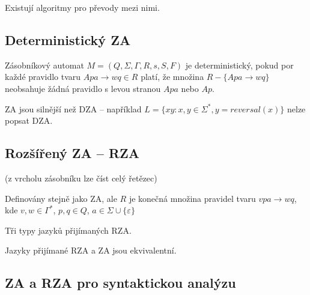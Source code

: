 \documentclass[a4wide]{report}
\begin{document}
Existují algoritmy pro převody mezi nimi.

\subsection{Deterministický ZA}

Zásobníkový automat $M = (Q, \Sigma, \Gamma, R, s, S, F)$ je deterministický, pokud por každé pravidlo tvaru $Apa \to wq \in R$ platí, že množina $R - \{ Apa \to wq \}$ neobsahuje žádná pravidlo s levou stranou $Apa$ nebo $Ap$.

ZA jsou silnější než DZA -- například $L = \{ xy: x,y \in \Sigma^*, y = reversal(x) \}$ nelze popsat DZA.

\subsection{Rozšířený ZA -- RZA}

(z vrcholu zásobníku lze číst celý řetězec)

Definovány stejně jako ZA, ale $R$ je konečná množina pravidel tvaru $vpa \to wq$, kde $v,w \in \Gamma^*$, $p,q \in Q$, $a \in \Sigma \cup \{\varepsilon\}$

Tři typy jazyků přijímaných RZA.

Jazyky přijímané RZA a ZA jsou ekvivalentní.

\subsection{ZA a RZA pro syntaktickou analýzu}
\end{document}
